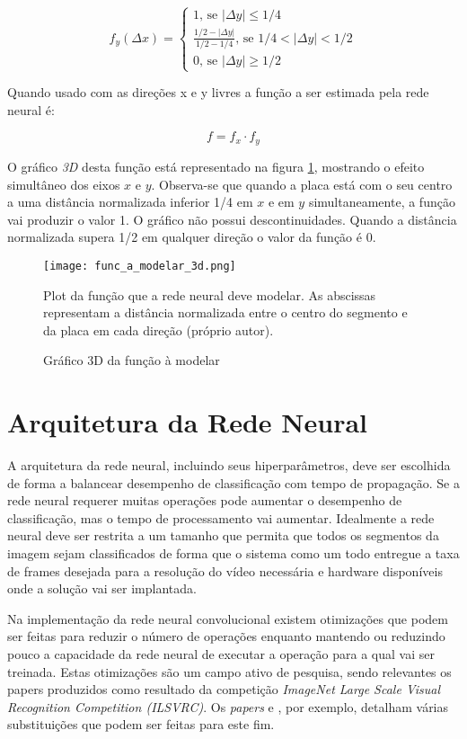 \begin{equation}
	f_y(\Delta x) = \begin{cases}
		1 \text{, se } |\Delta y| \leq 1/4
		\\
		\frac{1/2-|\Delta y|}{1/2-1/4} \text{, se } 1/4<|\Delta y|<1/2
		\\
		0 \text{, se } |\Delta y| \geq 1/2
	\end{cases}
\end{equation}

Quando usado com as direções x e y livres a função a ser estimada pela rede
neural é:

\begin{equation}
	f=f_x \cdot f_y
\end{equation}

O gráfico \emph{3D} desta função está representado na figura
\ref{fig:func_a_modelar_3d}, mostrando o
efeito simultâneo dos eixos $x$ e $y$.  Observa-se que quando a placa
está com o seu centro a uma distância normalizada inferior 1/4 em $x$ e em $y$
simultaneamente, a função vai produzir o valor 1. O gráfico não possui
descontinuidades. Quando a distância normalizada supera 1/2 em qualquer
direção o valor da função é 0.

\begin{figure}[!htb]
	\centering
	\texttt{[image: func\_a\_modelar\_3d.png]}
	\caption{Gráfico 3D da função à modelar}
	\label{fig:func_a_modelar_3d}
	Plot da função que a rede neural deve modelar. As abscissas representam a
	distância normalizada entre o centro do segmento e da placa em cada direção
	(próprio autor).
\end{figure}


\section{Arquitetura da Rede Neural}

A arquitetura da rede neural, incluindo seus hiperparâmetros, deve ser
escolhida de forma a balancear desempenho de classificação com tempo de
propagação. Se a rede neural requerer muitas operações pode aumentar o
desempenho de classificação, mas o tempo de processamento vai aumentar.
Idealmente a rede neural deve ser restrita a um tamanho que permita que todos
os segmentos da imagem sejam classificados de forma que o sistema como um todo
entregue a taxa de frames desejada para a resolução do vídeo necessária e
hardware disponíveis onde a solução vai ser implantada.

Na implementação da rede neural convolucional existem otimizações que podem ser
feitas para reduzir o número de operações enquanto mantendo ou reduzindo pouco
a capacidade da rede neural de executar a operação para a qual vai ser
treinada. Estas otimizações são um campo ativo de pesquisa, sendo relevantes os
papers produzidos como resultado da competição \emph{ImageNet Large Scale
Visual Recognition Competition (ILSVRC)}. Os \emph{papers}
\cite{szegedy2015going} e \cite{szegedy2015rethinking},
por exemplo, detalham várias substituições que podem ser feitas para este fim.


